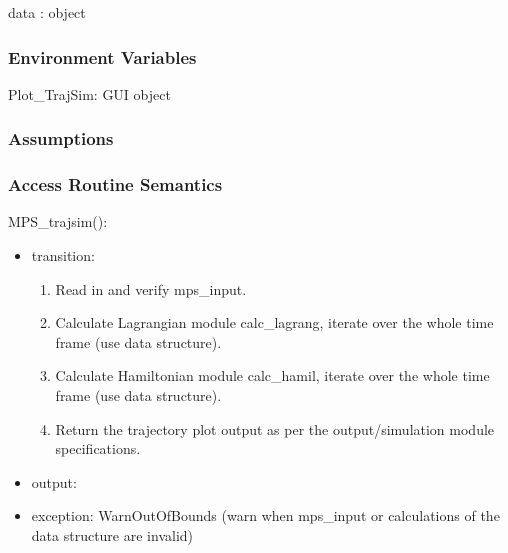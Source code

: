 \documentclass[12pt, titlepage]{article}
\begin{document}
data : object

\subsubsection{Environment Variables}

\noindent Plot{\_}TrajSim: GUI object\\


\subsubsection{Assumptions}


\subsubsection{Access Routine Semantics}

\noindent MPS\_trajsim():
\begin{itemize}
\item transition: 
\begin{enumerate}
\item Read in and verify mps\_input.
\item Calculate Lagrangian module calc\_lagrang, iterate over the whole 
time frame (use data structure).
\item Calculate Hamiltonian module calc\_hamil, iterate over the whole 
time frame (use data structure).
\item Return the trajectory plot output as per the output/simulation module 
specifications.
\end{enumerate}
\item output:  
\item exception: WarnOutOfBounds (warn when mps\_input or calculations of the 
data structure are invalid)  
\end{itemize}

\end{document}
